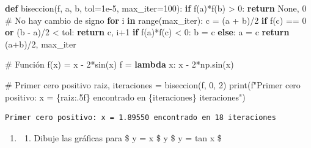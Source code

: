\documentclass[
  english,
  letterpaper,
  DIV=11,
  numbers=noendperiod]{scrartcl}
\newenvironment{Shaded}{\begin{snugshade}}{\end{snugshade}}
\newcommand{\BuiltInTok}[1]{\textcolor[rgb]{0.00,0.23,0.31}{#1}}
\newcommand{\CommentTok}[1]{\textcolor[rgb]{0.37,0.37,0.37}{#1}}
\newcommand{\ControlFlowTok}[1]{\textcolor[rgb]{0.00,0.23,0.31}{\textbf{#1}}}
\newcommand{\DecValTok}[1]{\textcolor[rgb]{0.68,0.00,0.00}{#1}}
\newcommand{\FloatTok}[1]{\textcolor[rgb]{0.68,0.00,0.00}{#1}}
\newcommand{\KeywordTok}[1]{\textcolor[rgb]{0.00,0.23,0.31}{\textbf{#1}}}
\newcommand{\NormalTok}[1]{\textcolor[rgb]{0.00,0.23,0.31}{#1}}
\newcommand{\OperatorTok}[1]{\textcolor[rgb]{0.37,0.37,0.37}{#1}}
\newcommand{\SpecialCharTok}[1]{\textcolor[rgb]{0.37,0.37,0.37}{#1}}
\newcommand{\SpecialStringTok}[1]{\textcolor[rgb]{0.13,0.47,0.30}{#1}}
\newcommand{\VariableTok}[1]{\textcolor[rgb]{0.07,0.07,0.07}{#1}}
\providecommand{\tightlist}{%
  \setlength{\itemsep}{0pt}\setlength{\parskip}{0pt}}
\begin{document}
\begin{Shaded}
\begin{Highlighting}[]
\KeywordTok{def}\NormalTok{ biseccion(f, a, b, tol}\OperatorTok{=}\FloatTok{1e{-}5}\NormalTok{, max\_iter}\OperatorTok{=}\DecValTok{100}\NormalTok{):}
    \ControlFlowTok{if}\NormalTok{ f(a)}\OperatorTok{*}\NormalTok{f(b) }\OperatorTok{\textgreater{}} \DecValTok{0}\NormalTok{:}
        \ControlFlowTok{return} \VariableTok{None}\NormalTok{, }\DecValTok{0}  \CommentTok{\# No hay cambio de signo}
    \ControlFlowTok{for}\NormalTok{ i }\KeywordTok{in} \BuiltInTok{range}\NormalTok{(max\_iter):}
\NormalTok{        c }\OperatorTok{=}\NormalTok{ (a }\OperatorTok{+}\NormalTok{ b)}\OperatorTok{/}\DecValTok{2}
        \ControlFlowTok{if}\NormalTok{ f(c) }\OperatorTok{==} \DecValTok{0} \KeywordTok{or}\NormalTok{ (b }\OperatorTok{{-}}\NormalTok{ a)}\OperatorTok{/}\DecValTok{2} \OperatorTok{\textless{}}\NormalTok{ tol:}
            \ControlFlowTok{return}\NormalTok{ c, i}\OperatorTok{+}\DecValTok{1}
        \ControlFlowTok{if}\NormalTok{ f(a)}\OperatorTok{*}\NormalTok{f(c) }\OperatorTok{\textless{}} \DecValTok{0}\NormalTok{:}
\NormalTok{            b }\OperatorTok{=}\NormalTok{ c}
        \ControlFlowTok{else}\NormalTok{:}
\NormalTok{            a }\OperatorTok{=}\NormalTok{ c}
    \ControlFlowTok{return}\NormalTok{ (a}\OperatorTok{+}\NormalTok{b)}\OperatorTok{/}\DecValTok{2}\NormalTok{, max\_iter}

\CommentTok{\# Función f(x) = x {-} 2*sin(x)}
\NormalTok{f }\OperatorTok{=} \KeywordTok{lambda}\NormalTok{ x: x }\OperatorTok{{-}} \DecValTok{2}\OperatorTok{*}\NormalTok{np.sin(x)}

\CommentTok{\# Primer cero positivo}
\NormalTok{raiz, iteraciones }\OperatorTok{=}\NormalTok{ biseccion(f, }\DecValTok{0}\NormalTok{, }\DecValTok{2}\NormalTok{)}
\BuiltInTok{print}\NormalTok{(}\SpecialStringTok{f"Primer cero positivo: x = }\SpecialCharTok{\{}\NormalTok{raiz}\SpecialCharTok{:.5f\}}\SpecialStringTok{ encontrado en }\SpecialCharTok{\{}\NormalTok{iteraciones}\SpecialCharTok{\}}\SpecialStringTok{ iteraciones"}\NormalTok{)}
\end{Highlighting}
\end{Shaded}

\begin{verbatim}
Primer cero positivo: x = 1.89550 encontrado en 18 iteraciones
\end{verbatim}

\begin{enumerate}
\def\labelenumi{\arabic{enumi}.}
\setcounter{enumi}{2}
\tightlist
\item
  \begin{enumerate}
  \def\labelenumii{\alph{enumii}.}
  \tightlist
  \item
    Dibuje las gráficas para \$ y = x \$ y \$ y = tan x \$
  \end{enumerate}
\end{enumerate}
\end{document}
